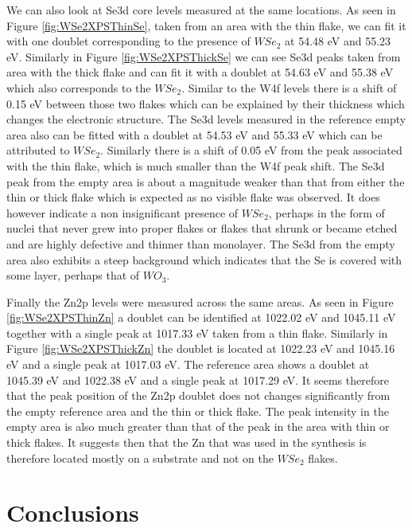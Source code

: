 We can also look at Se3d core levels measured at the same locations. As seen in Figure \ref{fig:WSe2XPSThinSe}, taken from an area with the thin flake, we can fit it with one doublet corresponding to the presence of $WSe_2$ at 54.48 eV and 55.23 eV. Similarly in Figure \ref{fig:WSe2XPSThickSe} we can see Se3d peaks taken from area with the thick flake and can fit it with a doublet at 54.63 eV and 55.38 eV which also corresponds to the $WSe_2$. Similar to the W4f levels there is a shift of 0.15 eV between those two flakes which can be explained by their thickness which changes the electronic structure. The Se3d levels measured in the reference empty area also can be fitted with a doublet at 54.53 eV and 55.33 eV which can be attributed to $WSe_2$. Similarly there is a shift of 0.05 eV from the peak associated with the thin flake, which is much smaller than the W4f peak shift. The Se3d peak from the empty area is about a magnitude weaker than that from either the thin or thick flake which is expected as no visible flake was observed. It does however indicate a non insignificant presence of $WSe_2$, perhaps in the form of nuclei that never grew into proper flakes or flakes that shrunk or became etched and are highly defective and thinner than monolayer. The Se3d from the empty area also exhibits a steep background which indicates that the Se is covered with some layer, perhaps that of $WO_3$. 

Finally the Zn2p levels were measured across the same areas. As seen in Figure \ref{fig:WSe2XPSThinZn} a doublet can be identified at 1022.02 eV and 1045.11 eV together with a single peak at 1017.33 eV taken from a thin flake. Similarly in Figure \ref{fig:WSe2XPSThickZn} the doublet is located at 1022.23 eV and 1045.16 eV and a single peak at 1017.03 eV. The reference area shows a doublet at 1045.39 eV and 1022.38 eV and a single peak at 1017.29 eV. It seems therefore that the peak position of the Zn2p doublet does not changes significantly from the empty reference area and the thin or thick flake. The peak intensity in the empty area is also much greater than that of the peak in the area with thin or thick flakes. It suggests then that the Zn that was used in the synthesis is therefore located mostly on a substrate and not on the $WSe_2$ flakes.

\section{Conclusions}

